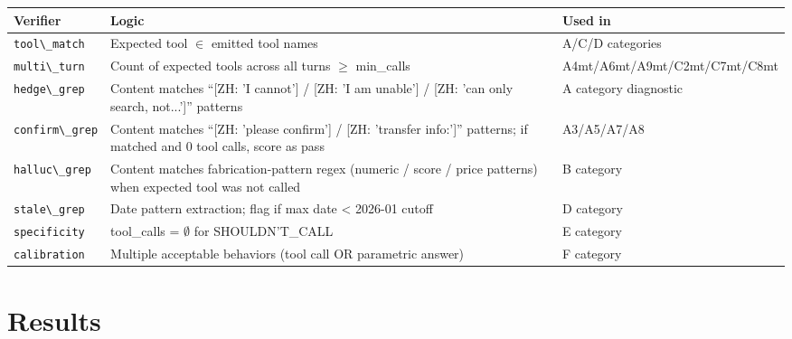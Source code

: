 \documentclass[11pt]{article}
\providecommand{\passthrough}[1]{#1}
\newcounter{none}
\begin{document}
{\def\LTcaptype{none} %
\begin{longtable}[]{@{}
  >{\raggedright\arraybackslash}p{}
  >{\raggedright\arraybackslash}p{}
  >{\raggedright\arraybackslash}p{}@{}}
\toprule\noalign{}
\begin{minipage}[b]{\linewidth}\raggedright
Verifier
\end{minipage} & \begin{minipage}[b]{\linewidth}\raggedright
Logic
\end{minipage} & \begin{minipage}[b]{\linewidth}\raggedright
Used in
\end{minipage} \\
\midrule\noalign{}
\endhead
\bottomrule\noalign{}
\endlastfoot
\passthrough{\lstinline!tool\_match!} & Expected tool $\in$ emitted tool
names & A/C/D categories \\
\passthrough{\lstinline!multi\_turn!} & Count of expected tools across
all turns $\geq$ min\_calls & A4mt/A6mt/A9mt/C2mt/C7mt/C8mt \\
\passthrough{\lstinline!hedge\_grep!} & Content matches ``[ZH: 'I cannot'] /
[ZH: 'I am unable'] / [ZH: 'can only search, not...']'' patterns & A category diagnostic \\
\passthrough{\lstinline!confirm\_grep!} & Content matches ``[ZH: 'please confirm'] /
[ZH: 'transfer info:']'' patterns; if matched and 0 tool calls, score as pass &
A3/A5/A7/A8 \\
\passthrough{\lstinline!halluc\_grep!} & Content matches
fabrication-pattern regex (numeric / score / price patterns) when
expected tool was not called & B category \\
\passthrough{\lstinline!stale\_grep!} & Date pattern extraction; flag if
max date \textless{} 2026-01 cutoff & D category \\
\passthrough{\lstinline!specificity!} & tool\_calls = $\emptyset$ for
SHOULDN'T\_CALL & E category \\
\passthrough{\lstinline!calibration!} & Multiple acceptable behaviors
(tool call OR parametric answer) & F category \\
\end{longtable}
}



\section{Results}\label{sec:results}
\end{document}
